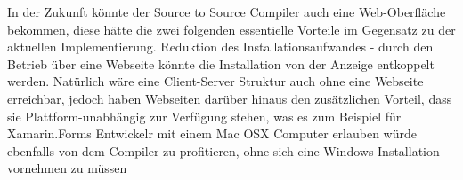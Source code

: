 In der Zukunft könnte der Source to Source Compiler auch eine Web-Oberfläche bekommen,  diese hätte die zwei folgenden essentielle Vorteile im Gegensatz zu der aktuellen Implementierung.  Reduktion des Installationsaufwandes - durch den Betrieb über eine Webseite könnte die Installation von der Anzeige entkoppelt werden.  Natürlich wäre eine Client-Server Struktur auch ohne eine Webseite erreichbar,  jedoch haben Webseiten darüber hinaus den zusätzlichen Vorteil,  dass sie Plattform-unabhängig zur Verfügung stehen,  was es zum Beispiel für Xamarin.Forms Entwickelr mit einem Mac OSX Computer erlauben würde ebenfalls von dem Compiler zu profitieren, ohne sich eine Windows Installation vornehmen zu müssen
